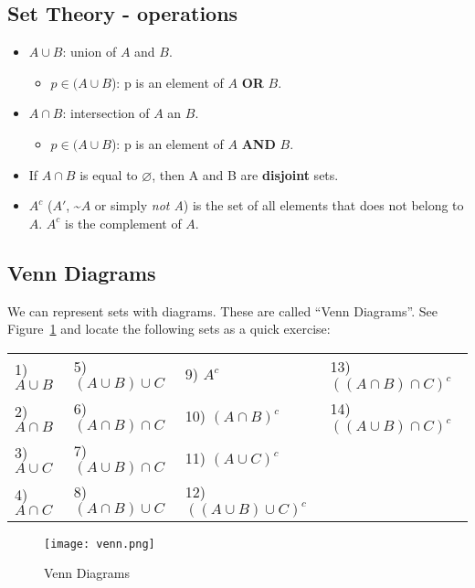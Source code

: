\documentclass[11pt]{article}
\let\emptyset\varnothing
\begin{document}
\subsection*{Set Theory - operations}

	\begin{itemize}
		\item $A \cup B$: union of $A$ and $B$.
		\begin{itemize}
			\item $p \in (A \cup B$): p is an element of $A$ \textbf{OR} $B$.
		\end{itemize}
		\item $A \cap B$: intersection of $A$ an $B$.
		\begin{itemize}
			\item $p \in (A \cup B$): p is an element of $A$ \textbf{AND} $B$.
		\end{itemize}
		\item If $A \cap B$ is equal to $\emptyset$, then A and B are \textbf{disjoint} sets.
		\item $A^c$ ($A'$, \textasciitilde$A$ or simply \emph{not A}) is the set of all elements that does not belong to $A$. $A^c$ is the complement of $A$. 

	\end{itemize}

\subsection*{Venn Diagrams}
 We can represent sets with diagrams. These are called ``Venn Diagrams''. See Figure~\ref{f1} and locate the following sets as a quick exercise:\\

\begin{tabular}{llll}
	1) $A \cup B$ & 5) $(A \cup B) \cup C$ & 9) $A^c$ & 13) $((A \cap B) \cap C)^c$\\
	2) $A \cap B$ & 6) $(A \cap B) \cap C$ & 10) $(A \cap B)^c$ & 14) $((A \cup B) \cap C)^c$\\
	3) $A \cup C$ & 7) $(A \cup B) \cap C$ & 11) $(A \cup C)^c$ &\\
	4) $A \cap C$ & 8) $(A \cap B) \cup C$ & 12) $((A \cup B) \cup C)^c$ &\\
\end{tabular}

\begin{figure}[htp]
\centering
\texttt{[image: venn.png]}
\caption{Venn Diagrams}
\label{f1}
\end{figure}
\end{document}
